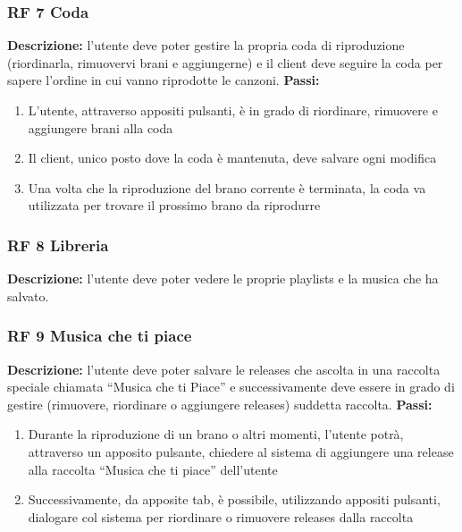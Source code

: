 \documentclass[a4paper,12pt]{article}
\begin{document}
\subsubsection*{RF 7 Coda}

\textbf{Descrizione:} l’utente deve poter gestire la propria coda di riproduzione (riordinarla, rimuovervi brani e aggiungerne) e il client deve seguire la coda per sapere l’ordine in cui vanno riprodotte le canzoni. \newline
\textbf{Passi:}
\begin{enumerate}
    \item L’utente, attraverso appositi pulsanti, è in grado di riordinare, rimuovere e aggiungere brani alla coda
    \item Il client, unico posto dove la coda è mantenuta, deve salvare ogni modifica
    \item Una volta che la riproduzione del brano corrente è terminata, la coda va utilizzata per trovare il prossimo brano da riprodurre
\end{enumerate}

\subsubsection*{RF 8 Libreria}

\textbf{Descrizione:} l’utente deve poter vedere le proprie playlists e la musica che ha salvato.

\subsubsection*{RF 9 Musica che ti piace}

\textbf{Descrizione:} l’utente deve poter salvare le releases che ascolta in una raccolta speciale chiamata “Musica che ti Piace” e successivamente deve essere in grado di gestire (rimuovere, riordinare o aggiungere releases) suddetta raccolta. \newline
\textbf{Passi:}
\begin{enumerate}
    \item Durante la riproduzione di un brano o altri momenti, l’utente potrà, attraverso un apposito pulsante, chiedere al sistema di aggiungere una release alla raccolta “Musica che ti piace” dell’utente
    \item Successivamente, da apposite tab, è possibile, utilizzando appositi pulsanti, dialogare col sistema per riordinare o rimuovere releases dalla raccolta
\end{enumerate}
\end{document}
